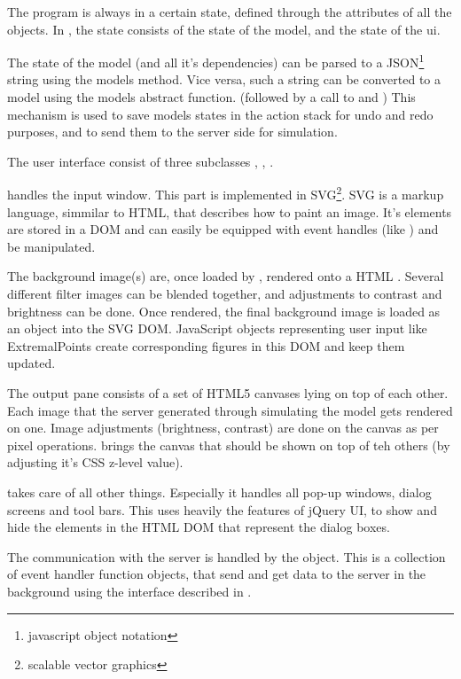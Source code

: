The program is always in a certain state, defined through the attributes of all the objects.
In \spl, the state consists of the state of the model, and the state of the ui.

The state of the model (and all it's dependencies) can be parsed to a JSON\footnote{javascript object notation} string using the models  method.
Vice versa, such a string can be converted to a model using the models abstract  function. (followed by a call to  and )
This mechanism is used to save models states in the action stack for undo and redo purposes, and to send them to the server side for simulation.


The user interface  consist of three subclasses , , .

 handles the input window. This part is implemented in SVG\footnote{scalable vector graphics}. SVG is a markup language, simmilar to HTML, that describes how to paint an image. It's elements are stored in a DOM and can easily be equipped with event handles (like ) and be manipulated.

The background image(s) are, once loaded by , rendered onto a HTML .
Several different filter images can be blended together, and adjustments to contrast and brightness can be done.
Once rendered, the final background image is loaded as an  object into the SVG DOM. JavaScript objects representing user input like ExtremalPoints create corresponding figures in this DOM and keep them updated.

The output pane  consists of a set of HTML5 canvases lying on top of each other.
Each image that the server generated through simulating the model gets rendered on one.
Image adjustments (brightness, contrast) are done on the canvas as per pixel operations.  brings the canvas that should be shown on top of teh others (by adjusting it's CSS z-level value).

 takes care of all other things. Especially it handles all pop-up windows, dialog screens and tool bars.
This uses heavily the features of jQuery UI, to show and hide the elements in the HTML DOM that represent the dialog boxes.



The communication with the server is handled by the  object.
This is a collection of event handler function objects, that send and get data to the server in the background using the interface described in .


